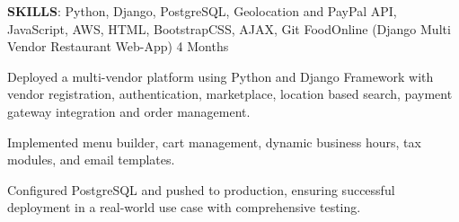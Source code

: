 \begin{cventries}
\cventry
    {\textbf{SKILLS}: Python, Django, PostgreSQL, Geolocation and PayPal API, JavaScript, AWS, HTML, BootstrapCSS, AJAX, Git} %
    {FoodOnline (Django Multi Vendor Restaurant Web-App)} %
    {4 Months} %
    {} %
    {
      \begin{cvitems} %
        \item {Deployed a multi-vendor platform using Python and Django Framework with vendor registration, authentication, marketplace, location based search, payment gateway integration and order management.}
        \item{Implemented menu builder, cart management, dynamic business hours, tax modules, and email templates.}
        \item{Configured PostgreSQL and pushed to production, ensuring successful deployment in a real-world use case with comprehensive testing.}
      \end{cvitems}
    }


\end{cventries}
